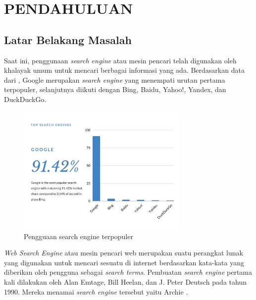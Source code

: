 
\chapter{PENDAHULUAN}

\section{Latar Belakang Masalah}

Saat ini, penggunaan \textit{search engine} atau mesin pencari telah digunakan oleh khalayak umum untuk mencari berbagai informasi yang ada. Berdasarkan data dari \citep{reliablesoft2022}, Google merupakan \textit{search engine} yang menempati urutan pertama terpopuler, selanjutnya diikuti dengan Bing, Baidu, Yahoo!, Yandex, dan DuckDuckGo.

\begin{figure}[h]
    \centering
    \includegraphics[width=0.75\textwidth]{gambar/Top Search Engine.png}
    \caption{Pengguaan search engine terpopuler \citep{reliablesoft2022}}
    \label{gambar:search_engine_populer}
\end{figure}

\textit{Web Search Engine} atau mesin pencari web merupakan suatu perangkat lunak yang digunakan untuk mencari sesuatu di internet berdasarkan kata-kata yang diberikan oleh pengguna sebagai \textit{search terms}. Pembuatan \textit{search engine} pertama kali dilakukan oleh Alan Emtage, Bill Heelan, dan J. Peter Deutsch pada tahun 1990. Mereka menamai \textit{search engine} tersebut yaitu Archie \citep{seymour2011history}.


